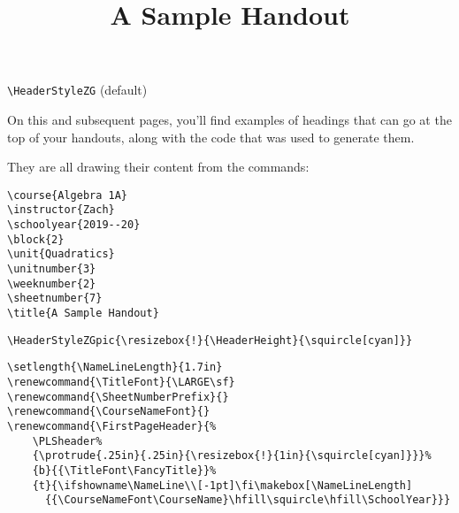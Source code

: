 \documentclass[12pt,twoside,parskip,notitle,showframe]{handout}
\title{A Sample Handout}
\begin{document}
\begingroup
\HeaderStyleZG
\maketitle
\verb|\HeaderStyleZG| (default)
\endgroup

\vfill
On this and subsequent pages, you'll find examples of headings that can go at the top of your handouts, along with the code that was used to generate them.

They are all drawing their content from the commands:
\begingroup
\singlespacing
\begin{verbatim}
\course{Algebra 1A}
\instructor{Zach}
\schoolyear{2019--20}
\block{2}
\unit{Quadratics}
\unitnumber{3}
\weeknumber{2}
\sheetnumber{7}
\title{A Sample Handout}
\end{verbatim}
\endgroup

\newpage

\begingroup
\HeaderStyleZGpic{\resizebox{!}{\HeaderHeight}{\squircle[cyan]}}
\maketitle
\verb|\HeaderStyleZGpic{\resizebox{!}{\HeaderHeight}{\squircle[cyan]}}|
\endgroup

\newpage

\begingroup
\setlength{\NameLineLength}{1.7in}
\renewcommand{\TitleFont}{\LARGE\sf}
\renewcommand{\SheetNumberPrefix}{}
\renewcommand{\CourseNameFont}{}
\renewcommand{\FirstPageHeader}{%
	\PLSheader%
	{\protrude{.25in}{.25in}{\resizebox{!}{1in}{\squircle[cyan]}}}%
	{b}{{\TitleFont\FancyTitle}}%
	{t}{\ifshowname\NameLine\\[-1pt]\fi\makebox[\NameLineLength]{{\CourseNameFont\CourseName}\hfill\squircle\hfill\SchoolYear}}}%
\maketitle
\singlespacing
\begin{verbatim}
\setlength{\NameLineLength}{1.7in}
\renewcommand{\TitleFont}{\LARGE\sf}
\renewcommand{\SheetNumberPrefix}{}
\renewcommand{\CourseNameFont}{}
\renewcommand{\FirstPageHeader}{%
    \PLSheader%
    {\protrude{.25in}{.25in}{\resizebox{!}{1in}{\squircle[cyan]}}}%
    {b}{{\TitleFont\FancyTitle}}%
    {t}{\ifshowname\NameLine\\[-1pt]\fi\makebox[\NameLineLength]
      {{\CourseNameFont\CourseName}\hfill\squircle\hfill\SchoolYear}}}
\end{verbatim}
\endgroup
\end{document}
